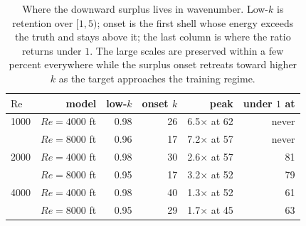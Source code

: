 \begin{table}[t]
  \centering
  \caption{Where the downward surplus lives in wavenumber. Low-$k$ is retention over $[1,5)$; onset is the first shell whose energy exceeds the truth and stays above it; the last column is where the ratio returns under $1$. The large scales are preserved within a few percent everywhere while the surplus onset retreats toward higher $k$ as the target approaches the training regime.}
  \label{tab:overshoot-onset}
  \begin{tabular}{lrrrrr}
    \toprule
    $\mathrm{Re}$ & model & low-$k$ & onset $k$ & peak & under $1$ at \\
    \midrule
    1000 & $Re{=}4000$ ft & 0.98 & 26 & 6.5$\times$ at 62 & never \\
     & $Re{=}8000$ ft & 0.96 & 17 & 7.2$\times$ at 57 & never \\
    2000 & $Re{=}4000$ ft & 0.98 & 30 & 2.6$\times$ at 57 & 81 \\
     & $Re{=}8000$ ft & 0.95 & 17 & 3.2$\times$ at 52 & 79 \\
    4000 & $Re{=}4000$ ft & 0.98 & 40 & 1.3$\times$ at 52 & 61 \\
     & $Re{=}8000$ ft & 0.95 & 29 & 1.7$\times$ at 45 & 63 \\
    \bottomrule
  \end{tabular}
\end{table}
